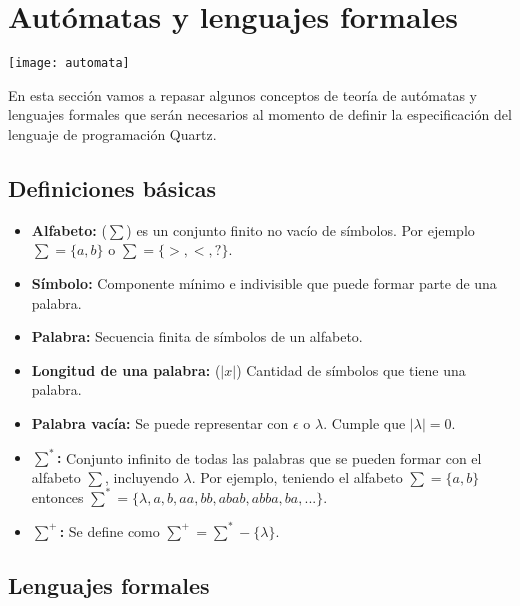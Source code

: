 \chapter{Autómatas y lenguajes formales}
\begin{center}
\vspace*{3cm}
\texttt{[image: automata]}
\end{center}

\newpage

En esta sección vamos a repasar algunos conceptos de teoría de autómatas y lenguajes formales que serán necesarios al momento de definir la especificación del lenguaje de programación Quartz.

\section{Definiciones básicas}

\begin{itemize}

\item \textbf{Alfabeto:} ($\sum$) es un conjunto finito no vacío de símbolos. Por ejemplo $\sum = \{a,b\}$ o $\sum = \{>,<,?\}$.

\item \textbf{Símbolo:} Componente mínimo e indivisible que puede formar parte de una palabra.

\item \textbf{Palabra:} Secuencia finita de símbolos de un alfabeto.

\item \textbf{Longitud de una palabra:} ($|x|$) Cantidad de símbolos que tiene una palabra.

\item \textbf{Palabra vacía: } Se puede representar con $\epsilon$ o $\lambda$. Cumple que $|\lambda| = 0$.

\item \textbf{$\sum^*$:} Conjunto infinito de todas las palabras que se pueden formar con el alfabeto $\sum$, incluyendo $\lambda$. Por ejemplo, teniendo el alfabeto $\sum = \{a, b\}$ entonces $\sum^* = \{\lambda, a, b, aa, bb, abab, abba, ba,...\}$.

\item \textbf{$\sum^+$:} Se define como $\sum^+ = \sum^* - \{\lambda\}$.

\end{itemize}

\section{Lenguajes formales}

